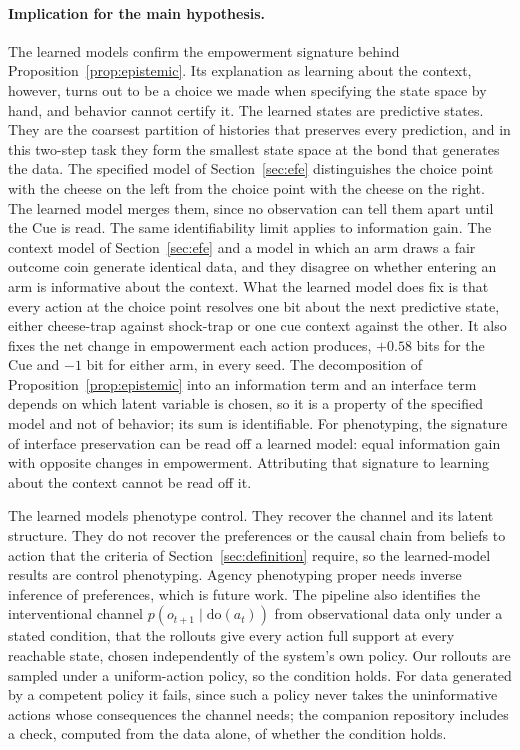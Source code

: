 \documentclass[letterpaper]{article} %
\theoremstyle{definition}
\begin{document}
\paragraph{Implication for the main hypothesis.} The learned models confirm the empowerment signature behind Proposition~\ref{prop:epistemic}. Its explanation as learning about the context, however, turns out to be a choice we made when specifying the state space by hand, and behavior cannot certify it. The learned states are predictive states. They are the coarsest partition of histories that preserves every prediction, and in this two-step task they form the smallest state space at the bond that generates the data. The specified model of Section~\ref{sec:efe} distinguishes the choice point with the cheese on the left from the choice point with the cheese on the right. The learned model merges them, since no observation can tell them apart until the Cue is read. The same identifiability limit applies to information gain. The context model of Section~\ref{sec:efe} and a model in which an arm draws a fair outcome coin generate identical data, and they disagree on whether entering an arm is informative about the context. What the learned model does fix is that every action at the choice point resolves one bit about the next predictive state, either cheese-trap against shock-trap or one cue context against the other. It also fixes the net change in empowerment each action produces, $+0.58$ bits for the Cue and $-1$ bit for either arm, in every seed. The decomposition of Proposition~\ref{prop:epistemic} into an information term and an interface term depends on which latent variable is chosen, so it is a property of the specified model and not of behavior; its sum is identifiable. For phenotyping, the signature of interface preservation can be read off a learned model: equal information gain with opposite changes in empowerment. Attributing that signature to learning about the context cannot be read off it.

The learned models phenotype control. They recover the channel and its latent structure. They do not recover the preferences or the causal chain from beliefs to action that the criteria of Section~\ref{sec:definition} require, so the learned-model results are control phenotyping. Agency phenotyping proper needs inverse inference of preferences, which is future work. The pipeline also identifies the interventional channel $p(o_{t+1} \mid \mathrm{do}(a_t))$ from observational data only under a stated condition, that the rollouts give every action full support at every reachable state, chosen independently of the system's own policy. Our rollouts are sampled under a uniform-action policy, so the condition holds. For data generated by a competent policy it fails, since such a policy never takes the uninformative actions whose consequences the channel needs; the companion repository includes a check, computed from the data alone, of whether the condition holds.
\end{document}
